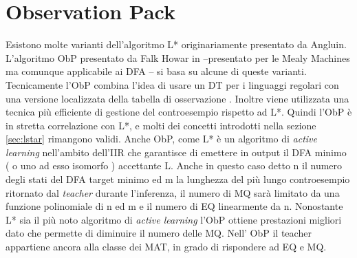 
\chapter{Observation Pack} %
\label{cap:quattro}
Esistono molte varianti dell'algoritmo L* originariamente presentato da Angluin. L'algoritmo \ac{ObP} presentato da Falk Howar in \cite{Howar12} --presentato per le Mealy Machines ma comunque applicabile ai DFA -- si basa su alcune di queste varianti. Tecnicamente l'\ac{ObP} combina l'idea di usare un \ac{DT} per i linguaggi regolari \cite{Kearns94} con una versione localizzata della tabella di osservazione \cite{Schapire93}. Inoltre viene utilizzata una tecnica più efficiente di gestione del controesempio rispetto ad L*. Quindi l'\ac{ObP}  è in stretta correlazione con L*, e molti dei concetti introdotti nella sezione \ref{sec:lstar} rimangono validi. Anche \ac{ObP}, come L* è un algoritmo di \textit{active learning} nell'ambito dell'\ac{IIR} che garantisce di emettere in output il \ac{DFA} minimo ( o uno ad esso isomorfo ) accettante \ac{L}. Anche in questo caso detto n il numero degli stati del DFA target minimo ed m la lunghezza del più lungo controesempio ritornato dal \textit{teacher} durante l'inferenza, il numero di \ac{MQ} sarà limitato da una funzione polinomiale di n ed m e il numero di \ac{EQ} linearmente da n. Nonostante L* sia il più noto algoritmo di \textit{active learning} l'\ac{ObP} ottiene prestazioni migliori dato che permette di diminuire il numero delle \ac{MQ}. Nell' \ac{ObP} il teacher appartiene ancora alla classe dei \ac{MAT}, in grado di rispondere ad \ac{EQ} e \ac{MQ}.
